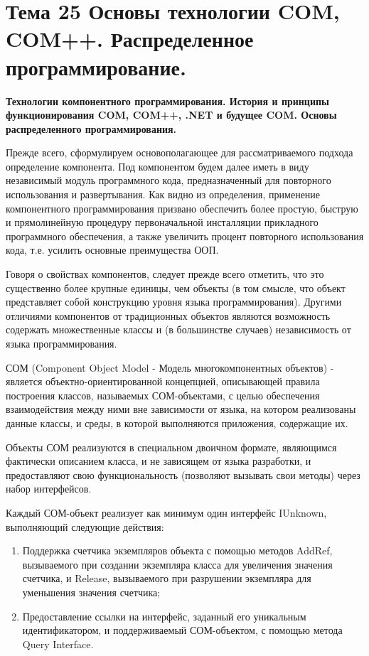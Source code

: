 \newpage 
\chapter{Тема 25 Основы технологии COM, COM++. Распределенное программирование.}

\begin{center}{\bfseries Технологии компонентного программирования. История и принципы функционирования COM, COM++, .NET и будущее COM. Основы распределенного программирования.}
\end{center}
  
Прежде всего, сформулируем основополагающее для рассматриваемого подхода определение компонента. Под компонентом будем далее иметь в виду независимый модуль программного кода, предназначенный для повторного использования и развертывания. Как видно из определения, применение компонентного программирования призвано обеспечить более простую, быструю и прямолинейную процедуру первоначальной инсталляции прикладного программного обеспечения, а также увеличить процент повторного использования кода, т.е. усилить основные преимущества ООП.

Говоря о свойствах компонентов, следует прежде всего отметить, что это существенно более крупные единицы, чем объекты (в том смысле, что объект представляет собой конструкцию уровня языка программирования). Другими отличиями компонентов от традиционных объектов являются возможность содержать множественные классы и (в большинстве случаев) независимость от языка программирования.

\begin{opr} 
  СОМ (Component Object Model - Модель многокомпонентных объектов) - является объектно-ориентированной концепцией, описывающей правила построения классов, называемых СОМ-объектами, с целью обеспечения взаимодействия между ними вне зависимости от языка, на котором реализованы данные классы, и среды, в которой выполняются приложения, содержащие их.
\end{opr}

Объекты СОМ реализуются в специальном двоичном формате, являющимся фактически описанием класса, и не зависящем от языка разработки, и предоставляют свою функциональность (позволяют вызывать свои методы) через набор интерфейсов.

\begin{utv}
  Каждый СОМ-объект реализует как минимум один интерфейс  IUnknown, выполняющий следующие действия: 
  \begin{enumerate}
    \item Поддержка счетчика экземпляров объекта с помощью методов AddRef, вызываемого при создании экземпляра класса для увеличения значения счетчика, и Release, вызываемого при разрушении экземпляра для уменьшения значения счетчика;
    \item Предоставление ссылки на интерфейс, заданный его уникальным идентификатором, и поддерживаемый СОМ-объектом, с помощью метода Query Interface.
  \end{enumerate}
\end{utv}

